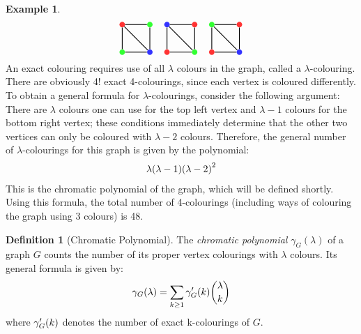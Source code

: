 \documentclass[svgnames]{article}
\theoremstyle{definition}
\newtheorem{Definition}{Definition}
\newtheorem*{Example*}{Example}
\theoremstyle{remark}
\theoremstyle{underline}
\theoremstyle{underline}
\begin{document}
\begin{Example*}
\begin{gather*}
			\tikz[baseline=(current bounding box.center),scale=1,auto=left,every node/.style={circle,inner sep=0pt,minimum size=2mm}]
			{
				\node[fill=red!80] (n1) at (0,1)	{};
				\node[fill=green!80] (n2) at (0,0)	{};
				\node[fill=green!80] (n3) at (1,1)	{};
				\node[fill=blue!80] (n4) at (1,0)	{};
				\foreach \from/\to in {n1/n2, n1/n3, n1/n4, n2/n4, n3/n4}
				\draw[thick] (\from) -- (\to);
			} \hspace{12pt} 
			\tikz[baseline=(current bounding box.center),scale=1,auto=left,every node/.style={circle,inner sep=0pt,minimum size=2mm}]
			{
				\node[fill=blue!80] (n1) at (0,1)	{};
				\node[fill=red!80] (n2) at (0,0)	{};
				\node[fill=red!80] (n3) at (1,1)	{};
				\node[fill=green!80] (n4) at (1,0)	{};
				\foreach \from/\to in {n1/n2, n1/n3, n1/n4, n2/n4, n3/n4}
				\draw[thick] (\from) -- (\to);
			} \hspace{12pt}
			\tikz[baseline=(current bounding box.center),scale=1,auto=left,every node/.style={circle,inner sep=0pt,minimum size=2mm}]
			{
				\node[fill=green!80] (n1) at (0,1)	{};
				\node[fill=red!80] (n2) at (0,0)	{};
				\node[fill=red!80] (n3) at (1,1)	{};
				\node[fill=blue!80] (n4) at (1,0)	{};
				\foreach \from/\to in {n1/n2, n1/n3, n1/n4, n2/n4, n3/n4}
				\draw[thick] (\from) -- (\to);
			}
		\end{gather*}
		An exact colouring requires use of all $\lambda$ colours in the graph, called a $\lambda$-colouring. There are obviously 4! exact 4-colourings, since each vertex is coloured differently. To obtain a general formula for $\lambda$-colourings, consider the following argument: There are $\lambda$ colours one can use for the top left vertex and $\lambda - 1$ colours for the bottom right vertex; these conditions immediately determine that the other two vertices can only be coloured with $\lambda - 2$ colours. Therefore, the general number of $\lambda$-colourings for this graph is given by the polynomial:
		\begin{gather*}
			\lambda\pqty{\lambda -1}\pqty{\lambda-2}^2
		\end{gather*}
		This is the chromatic polynomial of the graph, which will be defined shortly. Using this formula, the total number of 4-colourings (including ways of colouring the graph using 3 colours) is 48.
	\end{Example*}
	\begin{Definition}[Chromatic Polynomial]
		The \emph{chromatic polynomial} $\gamma_G(\lambda)$ of a graph $G$ counts the number of its proper vertex colourings with $\lambda$ colours. Its general formula is given by:
		\begin{gather*}
			\gamma_G\pqty{\lambda} = \sum_{k \geq 1} \gamma'_{G}\pqty{k}\binom{\lambda}{k}
		\end{gather*}
		where $\gamma'_{G}\pqty{k}$ denotes the number of exact k-colourings of $G$.
	\end{Definition}
\end{document}
